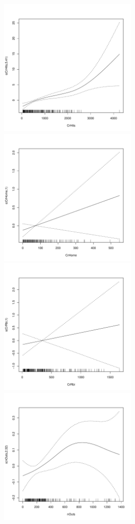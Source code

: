 \documentclass{article}\usepackage[]{graphicx}\usepackage[]{color}
\newenvironment{knitrout}{}{} %
\begin{document}
\begin{knitrout}
\includegraphics[width=0.50\textwidth]{figure/unnamed-chunk-3-4} 
\includegraphics[width=0.50\textwidth]{figure/unnamed-chunk-3-5} 
\includegraphics[width=0.50\textwidth]{figure/unnamed-chunk-3-6} 
\includegraphics[width=0.50\textwidth]{figure/unnamed-chunk-3-7} 

\end{knitrout}
\end{document}
